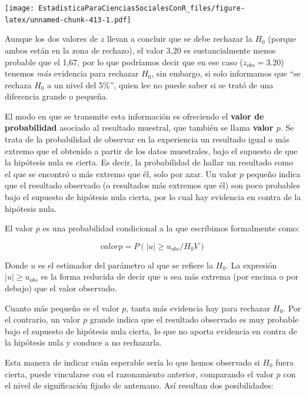 \documentclass[]{book}
\begin{document}
\texttt{[image: EstadisticaParaCienciasSocialesConR\_files/figure-latex/unnamed-chunk-413-1.pdf]}

Aunque los dos valores de \(z\) llevan a concluir que se debe rechazar la
\(H_{0}\) (porque ambos están en la zona de rechazo), el valor 3,20 es
sustancialmente menos probable que el 1,67, por lo que podríamos decir
que en ese caso (\(z_{obs}=3.20\)) tenemos \emph{más} evidencia para rechazar
\(H_{0}\), sin embargo, si solo informamos que ``se rechaza \(H_{0}\) a un nivel
del 5\%'', quien lee no puede saber si se trató de una diferencia grande o
pequeña.

El modo en que se transmite esta información es ofreciendo el \textbf{valor de probabilidad} asociado al resultado muestral, que también se llama
\textbf{valor \(p\)}. Se trata de la probabilidad de observar en la experiencia
un resultado igual o más extremo que el obtenido a partir de los datos
muestrales, bajo el supuesto de que la hipótesis nula es cierta. Es
decir, la probabilidad de hallar un resultado como el que se encontró o
más extremo que él, solo por azar. Un valor \(p\) pequeño indica que el
resultado observado (o resultados más extremos que él) son poco
probables bajo el supuesto de hipótesis nula cierta, por lo cual hay
evidencia en contra de la hipótesis nula.

El valor \(p\) es una probabilidad condicional a la que escribimos
formalmente como:

\[valor p=P( |u| \geq u_{obs}/H_{0}  V )\]

Donde \(u\) es el estimador del parámetro al que se refiere la \(H_{0}\). La
expresión \(|u| \geq u_{obs}\) es la forma reducida de
decir que \(u\) sea más extrema (por encima o por debajo) que el valor
observado.

Cuanto más pequeño es el valor \(p\), tanta más evidencia hay para
rechazar \(H_{0}\). Por el contrario, un valor \(p\) grande indica que el
resultado observado es muy probable bajo el supuesto de hipótesis nula
cierta, lo que no aporta evidencia en contra de la hipótesis nula y
conduce a no rechazarla.

Esta manera de indicar cuán esperable sería lo que hemos observado si
\(H_{0}\) fuera cierta, puede vincularse con el razonamiento anterior,
comparando el valor \(p\) con el nivel de significación fijado de
antemano. Así resultan dos posibilidades:
\end{document}
